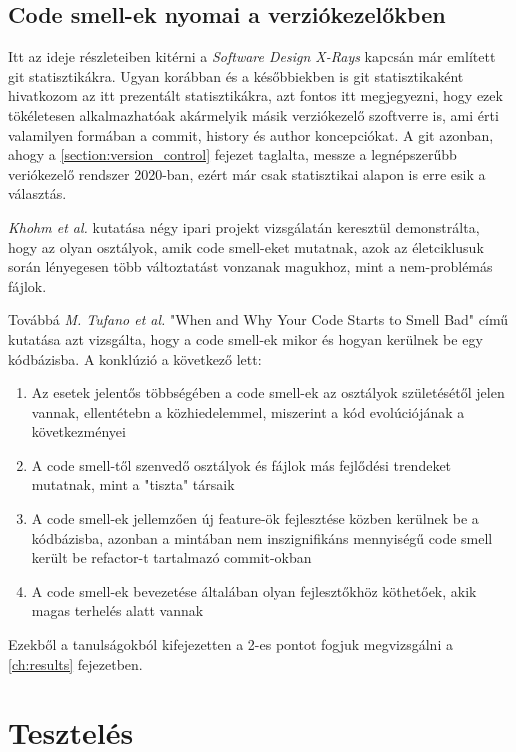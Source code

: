 \subsection{Code smell-ek nyomai a verziókezelőkben}

Itt az ideje részleteiben kitérni a \textit{Software Design X-Rays}\cite{tornhillXrays} kapcsán már említett git statisztikákra. Ugyan korábban és a későbbiekben is git statisztikaként hivatkozom az itt prezentált statisztikákra, azt fontos itt megjegyezni, hogy ezek tökéletesen alkalmazhatóak akármelyik másik verziókezelő szoftverre is, ami érti valamilyen formában a commit, history és author koncepciókat. A git azonban, ahogy a \ref{section:version_control} fejezet taglalta, messze a legnépszerűbb veriókezelő rendszer 2020-ban, ezért már csak statisztikai alapon is erre esik a választás.

\textit{Khohm et al.}\cite{khomh} kutatása négy ipari projekt vizsgálatán keresztül demonstrálta, hogy az olyan osztályok, amik code smell-eket mutatnak, azok az életciklusuk során lényegesen több változtatást vonzanak magukhoz, mint a nem-problémás fájlok.

Továbbá \textit{M. Tufano et al.} "When and Why Your Code Starts to Smell Bad"\cite{codeSmells} című kutatása azt vizsgálta, hogy a code smell-ek mikor és hogyan kerülnek be egy kódbázisba. A konklúzió a következő lett:
\begin{enumerate}
    \item Az esetek jelentős többségében a code smell-ek az osztályok születésétől jelen vannak, ellentétebn a közhiedelemmel, miszerint a kód evolúciójának a következményei
    \item A code smell-től szenvedő osztályok és fájlok más fejlődési trendeket mutatnak, mint a "tiszta" társaik
    \item A code smell-ek jellemzően új feature-ök fejlesztése közben kerülnek be a kódbázisba, azonban a mintában nem inszignifikáns mennyiségű code smell került be refactor-t tartalmazó commit-okban
    \item A code smell-ek bevezetése általában olyan fejlesztőkhöz köthetőek, akik magas terhelés alatt vannak
\end{enumerate}

Ezekből a tanulságokból kifejezetten a 2-es pontot fogjuk megvizsgálni a \ref{ch:results} fejezetben.

\section{Tesztelés}


